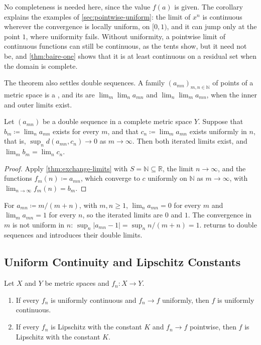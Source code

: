 No completeness is needed here, since the value $f(a)$ is given. The corollary explains the examples of \cref{sec:pointwise-uniform}: the limit of $x^n$ is continuous wherever the convergence is locally uniform, on $[0,1)$, and it can jump only at the point $1$, where uniformity fails. Without uniformity, a pointwise limit of continuous functions can still be continuous, as the tents show, but it need not be, and \cref{thm:baire-one} shows that it is at least continuous on a residual set when the domain is complete.

The theorem also settles double sequences. A family $(a_{mn})_{m,n\in\mathbb N}$ of points of a metric space is a , and its  are $\lim_m\lim_na_{mn}$ and $\lim_n\lim_ma_{mn}$, when the inner and outer limits exist.

\begin{corollary}
\label{cor:iterated-limits}
Let $(a_{mn})$ be a double sequence in a complete metric space $Y$. Suppose that $b_m\coloneqq\lim_na_{mn}$ exists for every $m$, and that $c_n\coloneqq\lim_ma_{mn}$ exists uniformly in $n$, that is, $\sup_nd(a_{mn},c_n)\to0$ as $m\to\infty$. Then both iterated limits exist, and $\lim_mb_m=\lim_nc_n$.
\end{corollary}

\begin{proof}
Apply \cref{thm:exchange-limits} with $S=\mathbb N\subseteq\mathbb R$, the limit $n\to\infty$, and the functions $f_m(n)\coloneqq a_{mn}$, which converge to $c$ uniformly on $\mathbb N$ as $m\to\infty$, with $\lim_{n\to\infty}f_m(n)=b_m$.
\end{proof}

For $a_{mn}\coloneqq m/(m+n)$, with $m,n\ge1$, $\lim_na_{mn}=0$ for every $m$ and $\lim_ma_{mn}=1$ for every $n$, so the iterated limits are $0$ and $1$. The convergence in $m$ is not uniform in $n$: $\sup_n|a_{mn}-1|=\sup_nn/(m+n)=1$.  returns to double sequences and introduces their double limits.

\subsection{Uniform Continuity and Lipschitz Constants}

\begin{proposition}
\label{prop:limit-uniformly-continuous}
Let $X$ and $Y$ be metric spaces and $f_n\colon X\to Y$.
\begin{enumerate}
\item If every $f_n$ is uniformly continuous and $f_n\to f$ uniformly, then $f$ is uniformly continuous.
\item If every $f_n$ is Lipschitz with the constant $K$ and $f_n\to f$ pointwise, then $f$ is Lipschitz with the constant $K$.
\end{enumerate}
\end{proposition}

